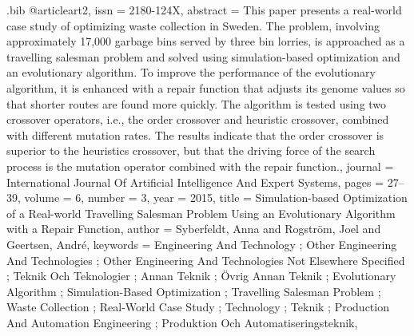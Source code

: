 \begin{filecontents}{\jobname.bib}
	@article{art2,
		issn = {2180-124X},
		abstract = {This paper presents a real-world case study of optimizing waste collection in Sweden. The problem, involving approximately 17,000 garbage bins served by three bin lorries, is approached as a travelling salesman problem and solved using simulation-based optimization and an evolutionary algorithm. To improve the performance of the evolutionary algorithm, it is enhanced with a repair function that adjusts its genome values so that shorter routes are found more quickly. The algorithm is tested using two crossover operators, i.e., the order crossover and heuristic crossover, combined with different mutation rates. The results indicate that the order crossover is superior to the heuristics crossover, but that the driving force of the search process is the mutation operator combined with the repair function.},
		journal = {International Journal Of Artificial Intelligence And Expert Systems},
		pages = {27--39},
		volume = {6},
		number = {3},
		year = {2015},
		title = {Simulation-based Optimization of a Real-world Travelling Salesman Problem Using an Evolutionary Algorithm with a Repair Function},
		author = {Syberfeldt, Anna and Rogstr\"om, Joel and Geertsen, Andr\'e},
		keywords = {Engineering And Technology ; Other Engineering And Technologies ; Other Engineering And Technologies Not Elsewhere Specified ; Teknik Och Teknologier ; Annan Teknik ; \"Ovrig Annan Teknik ; Evolutionary Algorithm ; Simulation-Based Optimization ; Travelling Salesman Problem ; Waste Collection ; Real-World Case Study ; Technology ; Teknik ; Production And Automation Engineering ; Produktion Och Automatiseringsteknik},
	}
	

\end{filecontents}
